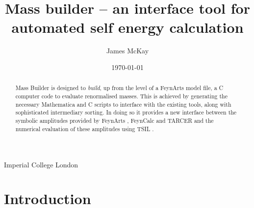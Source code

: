 



\def\A{\mathcal{A}}
\def\B{\mathcal{B}}
\def\C{\mathcal{C}}

\newcommand{\mb}{\textsf{Mass Builder} }
\newcommand{\mbs}{\textsf{Mass Builder}}
\newcommand{\tsil}{\textsf{TSIL} }
\newcommand{\tsils}{\textsf{TSIL}}
\newcommand{\tarcer}{\textsf{TARCER} }
\newcommand{\tarcers}{\textsf{TARCER}}
\newcommand{\sarah}{\textsf{SARAH} }
\newcommand{\sarahs}{\textsf{SARAH}}
\newcommand{\feynarts}{\textsf{FeynArts} }
\newcommand{\feynartss}{\textsf{FeynArts}}
\newcommand{\feyncalc}{\textsf{FeynCalc} }
\newcommand{\feyncalcs}{\textsf{FeynCalc}}
\newcommand{\cmake}{\textsf{cmake} }

\newcommand{\mathematica}{\textsf{Mathematica} }



\newcommand{\CC}{C\nolinebreak\hspace{-.05em}\raisebox{.4ex}{\tiny\bf +}\nolinebreak\hspace{-.10em}\raisebox{.4ex}{\tiny\bf +} }

\graphicspath{ {Figures/}}

\title{Mass builder -- an interface tool for automated self energy calculation}
%
\author
{
  James McKay
}
%
%
\institute
{
  Imperial College London\label{addr1}
}
%
\date{\today}

\maketitle

\begin{abstract}

\mb is designed to \textit{build}, up from the level of a \feynarts model file, a \CC computer code to evaluate renormalised masses.  This is achieved by generating the necessary \mathematica and \CC scripts to interface with the existing tools, along with sophisticated intermediary sorting.  In doing so it provides a new interface between the symbolic amplitudes provided by \feynarts \cite{Hahn2000}, \feyncalc \cite{Mertig1991,Shtabovenko2016} and \tarcer \cite{Mertig1998} and the numerical evaluation of these amplitudes using \tsil \cite{Martin2006}.  

\end{abstract}

\tableofcontents

\section{Introduction}

